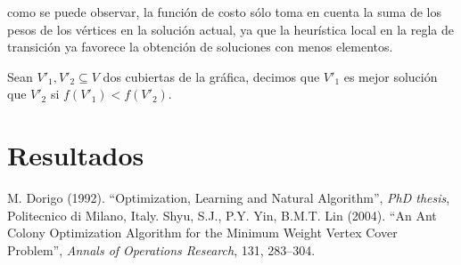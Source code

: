 \documentclass[12pt, letterpaper]{article}
\begin{document}
\noindent
como se puede observar, la función de costo sólo toma en cuenta la suma de los pesos de los vértices en la solución actual, ya que la heurística local en la regla de transición ya favorece la obtención de soluciones con menos elementos.
\par
Sean $V'_1, V'_2 \subseteq V$ dos cubiertas de la gráfica, decimos que $V'_1$ es mejor solución que $V'_2$ si $f(V'_1) < f(V'_2)$.

\section{Resultados}


\begin{thebibliography}{2}
M. Dorigo (1992). ``Optimization, Learning and Natural Algorithm'', \textit{PhD thesis}, Politecnico di Milano, Italy.
Shyu, S.J., P.Y. Yin, B.M.T. Lin (2004). ``An Ant Colony Optimization Algorithm for the Minimum Weight Vertex Cover Problem'', \textit{Annals of Operations Research}, 131, 283–304.
\end{thebibliography}
\end{document}
